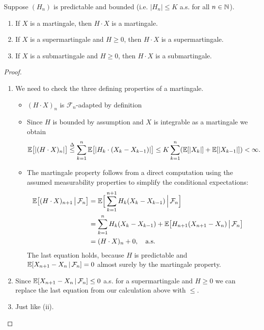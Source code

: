 \begin{lsatz}
\begin{theorem}\label{you_cannot_beat_the_system}
	Suppose $(H_n)$ is predictable and bounded (i.e. $\lvert H_n\rvert \leq K$ a.s. for all $n\in \mathbb{N}$).
	\begin{enumerate}[label=(\roman*)]	
		\item
			If $X$ is a martingale, then $H\cdot X$ is  a martingale.
		\item
			If $X$ is a supermartingale and $H \geq 0$, then $H\cdot X$ is a supermartingale.
		\item
			If $X$ is a submartingale and $H \geq 0$, then $H\cdot X$ is a submartingale.	
	\end{enumerate}
\end{theorem}
\end{lsatz}
\begin{proof}
	\begin{enumerate}[label=(\roman*)]	
		\item We need to check the three defining properties of a martingale.
			\begin{itemize}
				\item
					$(H\cdot X)_n$ is $\mathcal F_n$-adapted by definition
				\item Since $H$ is bounded by assumption and $X$ is integrable as a martingale we obtain
				\begin{align*}
					\mathbb{E}\big[|(H\cdot X )_n|\big] \overset{\Delta}{\leq}  \sum\limits_{k=1}^{n}\mathbb{E}\big[|H_k \cdot (X_k - X_{k-1})|\big] \leq K \sum_{k=1}^n (\mathbb{E}[|X_k|]+\mathbb{E}[|X_{k-1}|])<\infty.
				\end{align*}
							\item
				The martingale property follows from a direct computation using the assumed measurability properties to simplify the conditional expectations:
					\begin{align*}
						\mathbb{E}\big[ (H\cdot X)_{n+1}\,\big|\,\mathcal{F}_n\big] &= \mathbb{E} \Big[ \sum\limits_{k=1}^{n+1} H_k (X_k-X_{k-1})\,\Big|\, \mathcal{F}_n \Big] \\
						&=\sum\limits_{k=1}^{n} H_k(X_k-X_{k-1}) + \mathbb{E}\big[ H_{n+1}(X_{n+1}-X_n)\,\big|\,\mathcal{F}_n\big] \\
						&= (H\cdot X)_n+0,\quad \text{a.s.}
					\end{align*}
					The last equation holds, because $H$ is predictable and $\mathbb{E}[X_{n+1}-X_n\,|\,\mathcal{F}_n]=0$ almost surely by the martingale property.
			\end{itemize}
		\item
			Since $\mathbb{E}[X_{n+1}-X_n\,|\,\mathcal{F}_n]\leq 0$ a.s. for a supermartingale and $H \geq 0$ we can replace the last equation from our calculation above with $\leq$.
		\item
			Just like (ii).
	\end{enumerate}
\end{proof}
